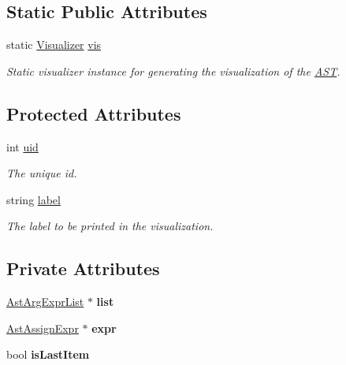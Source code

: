 \subsection*{Static Public Attributes}
\begin{DoxyCompactItemize}
\item 
\hypertarget{classAST_aca9e6637209b31e03a09c0d42f29bdfa}{static \hyperlink{classVisualizer}{Visualizer} \hyperlink{classAST_aca9e6637209b31e03a09c0d42f29bdfa}{vis}}\label{classAST_aca9e6637209b31e03a09c0d42f29bdfa}

\begin{DoxyCompactList}\small\item\em Static visualizer instance for generating the visualization of the \hyperlink{classAST}{A\-S\-T}. \end{DoxyCompactList}\end{DoxyCompactItemize}
\subsection*{Protected Attributes}
\begin{DoxyCompactItemize}
\item 
\hypertarget{classAST_a847b778f1c3dd5a19de32de432ee6e15}{int \hyperlink{classAST_a847b778f1c3dd5a19de32de432ee6e15}{uid}}\label{classAST_a847b778f1c3dd5a19de32de432ee6e15}

\begin{DoxyCompactList}\small\item\em The unique id. \end{DoxyCompactList}\item 
\hypertarget{classAST_ab2e239ccc0688d2341724432ff5a1a31}{string \hyperlink{classAST_ab2e239ccc0688d2341724432ff5a1a31}{label}}\label{classAST_ab2e239ccc0688d2341724432ff5a1a31}

\begin{DoxyCompactList}\small\item\em The label to be printed in the visualization. \end{DoxyCompactList}\end{DoxyCompactItemize}
\subsection*{Private Attributes}
\begin{DoxyCompactItemize}
\item 
\hypertarget{classAstArgExprList_a4a0fd4e00397023f7e4b4314423d4480}{\hyperlink{classAstArgExprList}{Ast\-Arg\-Expr\-List} $\ast$ {\bfseries list}}\label{classAstArgExprList_a4a0fd4e00397023f7e4b4314423d4480}

\item 
\hypertarget{classAstArgExprList_aad0631c6ff771c0feb1d06e2740afe6e}{\hyperlink{classAstAssignExpr}{Ast\-Assign\-Expr} $\ast$ {\bfseries expr}}\label{classAstArgExprList_aad0631c6ff771c0feb1d06e2740afe6e}

\item 
\hypertarget{classAstArgExprList_a38260d038461e9bad44d41cc7f663c52}{bool {\bfseries is\-Last\-Item}}\label{classAstArgExprList_a38260d038461e9bad44d41cc7f663c52}

\end{DoxyCompactItemize}


